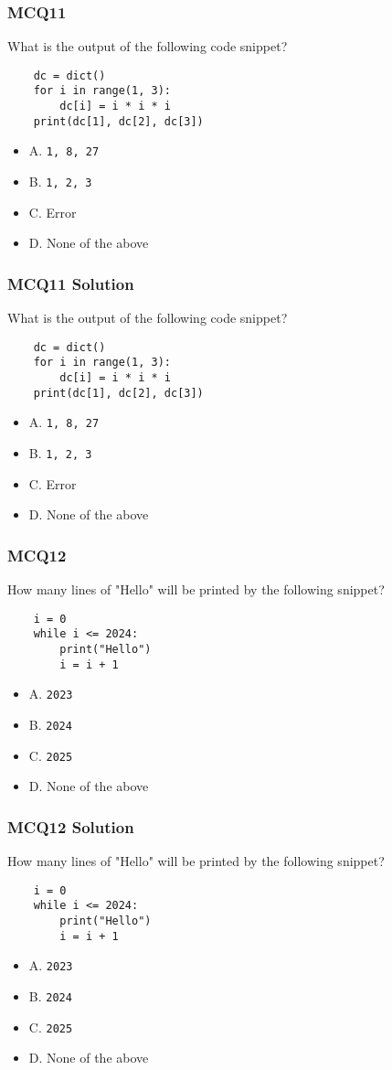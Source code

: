 \documentclass{beamer}
\begin{document}
\begin{frame}[fragile]
    \frametitle{MCQ11}
    What is the output of the following code snippet?
    \begin{verbatim}
    dc = dict()
    for i in range(1, 3):
        dc[i] = i * i * i
    print(dc[1], dc[2], dc[3])
    \end{verbatim}
    \begin{itemize}
        \item A. \texttt{1, 8, 27}
        \item B. \texttt{1, 2, 3}
        \item C. Error
        \item D. None of the above
    \end{itemize}
\end{frame}
\begin{frame}[fragile]
    \frametitle{MCQ11 Solution}
    What is the output of the following code snippet?
    \begin{verbatim}
    dc = dict()
    for i in range(1, 3):
        dc[i] = i * i * i
    print(dc[1], dc[2], dc[3])
    \end{verbatim}
    \begin{itemize}
        \item A. \texttt{1, 8, 27}
        \item B. \texttt{1, 2, 3}
        \item \alert{C. Error}
        \item D. None of the above
    \end{itemize}
\end{frame}

\begin{frame}[fragile]
    \frametitle{MCQ12}
    How many lines of "Hello" will be printed by the following snippet?
    \begin{verbatim}
    i = 0
    while i <= 2024:
        print("Hello")
        i = i + 1
    \end{verbatim}
    \begin{itemize}
        \item A. \texttt{2023}
        \item B. \texttt{2024}
        \item C. \texttt{2025}
        \item D. None of the above
    \end{itemize}
\end{frame}
\begin{frame}[fragile]
    \frametitle{MCQ12 Solution}
    How many lines of "Hello" will be printed by the following snippet?
    \begin{verbatim}
    i = 0
    while i <= 2024:
        print("Hello")
        i = i + 1
    \end{verbatim}
    \begin{itemize}
        \item A. \texttt{2023}
        \item B. \texttt{2024}
        \item \alert{C. \texttt{2025}}
        \item D. None of the above
    \end{itemize}
\end{frame}
\end{document}
